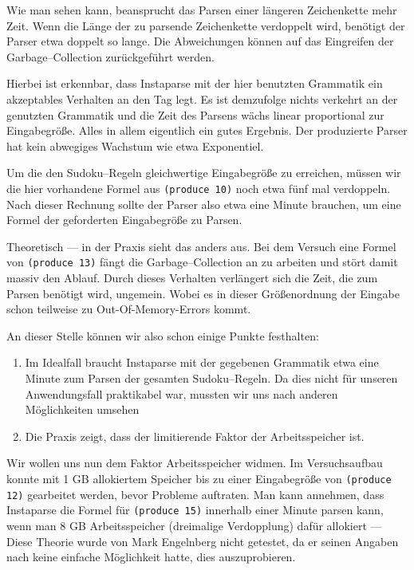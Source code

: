 \documentclass[ngerman,a4paper,abstracton,open=right,twoside=false,toc=listofnumbered,bibtotocnumbered]{scrreprt}
\begin{document}
Wie man sehen kann, beansprucht das Parsen einer längeren Zeichenkette mehr Zeit. Wenn die Länge der zu parsende Zeichenkette verdoppelt wird, benötigt der Parser etwa doppelt so lange. Die Abweichungen können auf das Eingreifen der Garbage--Collection zurückgeführt werden.

Hierbei ist erkennbar, dass Instaparse mit der hier benutzten Grammatik ein akzeptables Verhalten an den Tag legt. Es ist demzufolge nichts verkehrt an der genutzten Grammatik und die Zeit des Parsens wächs linear proportional zur Eingabegröße. Alles in allem eigentlich ein gutes Ergebnis. Der produzierte Parser hat kein abwegiges Wachstum wie etwa Exponentiel.

Um die den Sudoku--Regeln gleichwertige Eingabegröße zu erreichen, müssen wir die hier vorhandene Formel aus \lstinline|(produce 10)| noch etwa fünf mal verdoppeln. Nach dieser Rechnung sollte der Parser also etwa eine Minute brauchen, um eine Formel der geforderten Eingabegröße zu Parsen.

Theoretisch --- in der Praxis sieht das anders aus. Bei dem Versuch eine Formel von \lstinline|(produce 13)| fängt die Garbage--Collection an zu arbeiten und stört damit massiv den Ablauf. Durch dieses Verhalten verlängert sich die Zeit, die zum Parsen benötigt wird, ungemein. Wobei es in dieser Größenordnung der Eingabe schon teilweise zu Out-Of-Memory-Errors kommt.


An dieser Stelle können wir also schon einige Punkte festhalten:

\begin{enumerate}
	\item Im Idealfall braucht Instaparse mit der gegebenen Grammatik etwa eine Minute zum Parsen der gesamten Sudoku--Regeln. Da dies nicht für unseren Anwendungsfall praktikabel war, mussten wir uns nach anderen Möglichkeiten umsehen
	\item Die Praxis zeigt, dass der limitierende Faktor der Arbeitsspeicher ist.
\end{enumerate}

Wir wollen uns nun dem Faktor Arbeitsspeicher widmen. Im Versuchsaufbau konnte mit 1 GB allokiertem Speicher bis zu einer Eingabegröße von \lstinline|(produce 12)| gearbeitet werden, bevor Probleme auftraten. Man kann annehmen, dass Instaparse die Formel für \lstinline|(produce 15)| innerhalb einer Minute parsen kann, wenn man 8 GB Arbeitsspeicher (dreimalige Verdopplung) dafür allokiert --- Diese Theorie wurde von Mark Engelnberg nicht getestet, da er seinen Angaben nach keine einfache Möglichkeit hatte, dies auszuprobieren.\\
\end{document}
